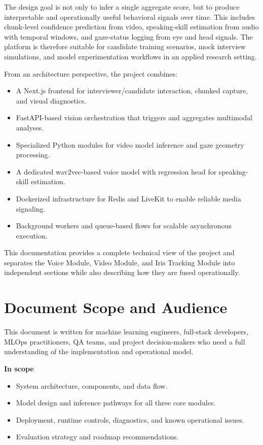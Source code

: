 \documentclass[12pt,a4paper]{report}
\begin{document}
The design goal is not only to infer a single aggregate score, but to produce interpretable and operationally useful behavioral signals over time. This includes chunk-level confidence prediction from video, speaking-skill estimation from audio with temporal windows, and gaze-status logging from eye and head signals. The platform is therefore suitable for candidate training scenarios, mock interview simulations, and model experimentation workflows in an applied research setting.

From an architecture perspective, the project combines:
\begin{itemize}[leftmargin=1.5em]
\item A Next.js frontend for interviewer/candidate interaction, chunked capture, and visual diagnostics.
\item FastAPI-based vision orchestration that triggers and aggregates multimodal analyses.
\item Specialized Python modules for video model inference and gaze geometry processing.
\item A dedicated wav2vec-based voice model with regression head for speaking-skill estimation.
\item Dockerized infrastructure for Redis and LiveKit to enable reliable media signaling.
\item Background workers and queue-based flows for scalable asynchronous execution.
\end{itemize}

This documentation provides a complete technical view of the project and separates the Voice Module, Video Module, and Iris Tracking Module into independent sections while also describing how they are fused operationally.

\chapter*{Document Scope and Audience}
This document is written for machine learning engineers, full-stack developers, MLOps practitioners, QA teams, and project decision-makers who need a full understanding of the implementation and operational model.

\textbf{In scope}
\begin{itemize}[leftmargin=1.5em]
\item System architecture, components, and data flow.
\item Model design and inference pathways for all three core modules.
\item Deployment, runtime controls, diagnostics, and known operational issues.
\item Evaluation strategy and roadmap recommendations.
\end{itemize}
\end{document}
